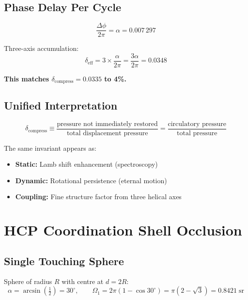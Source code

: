 \subsection{Phase Delay Per Cycle}

\begin{equation}
  \frac{\Delta\phi}{2\pi} = \alpha = 0.007\,297
\end{equation}

Three-axis accumulation:
\begin{equation}
  \delta_{\text{eff}} = 3 \times \frac{\alpha}{2\pi} = \frac{3\alpha}{2\pi} = 0.0348
\end{equation}

\textbf{This matches $\delta_{\text{compress}} = 0.0335$ to 4\%.}

\subsection{Unified Interpretation}

\begin{equation}
  \delta_{\text{compress}} \equiv
    \frac{\text{pressure not immediately restored}}{\text{total displacement pressure}}
  = \frac{\text{circulatory pressure}}{\text{total pressure}}
\end{equation}

The same invariant appears as:
\begin{itemize}
  \item \textbf{Static:} Lamb shift enhancement (spectroscopy)
  \item \textbf{Dynamic:} Rotational persistence (eternal motion)
  \item \textbf{Coupling:} Fine structure factor from three helical axes
\end{itemize}


\section{HCP Coordination Shell Occlusion}

\subsection{Single Touching Sphere}

Sphere of radius $R$ with centre at $d = 2R$:
\begin{equation}
  \alpha = \arcsin\!\left(\tfrac{1}{2}\right) = 30^\circ, \qquad
  \Omega_1 = 2\pi(1 - \cos 30^\circ) = \pi(2 - \sqrt{3}) = 0.8421\;\text{sr}
\end{equation}

